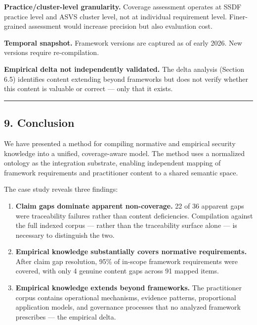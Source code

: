\documentclass[
]{article}
\begin{document}
\textbf{Practice/cluster-level granularity.} Coverage assessment
operates at SSDF practice level and ASVS cluster level, not at
individual requirement level. Finer-grained assessment would increase
precision but also evaluation cost.

\textbf{Temporal snapshot.} Framework versions are captured as of early
2026. New versions require re-compilation.

\textbf{Empirical delta not independently validated.} The delta analysis
(Section 6.5) identifies content extending beyond frameworks but does
not verify whether this content is valuable or correct --- only that it
exists.

\begin{center}\rule{0.5\linewidth}{0.5pt}\end{center}

\subsection{9. Conclusion}\label{conclusion}

We have presented a method for compiling normative and empirical
security knowledge into a unified, coverage-aware model. The method uses
a normalized ontology as the integration substrate, enabling independent
mapping of framework requirements and practitioner content to a shared
semantic space.

The case study reveals three findings:

\begin{enumerate}
\def\labelenumi{\arabic{enumi}.}
\item
  \textbf{Claim gaps dominate apparent non-coverage.} 22 of 36 apparent
  gaps were traceability failures rather than content deficiencies.
  Compilation against the full indexed corpus --- rather than the
  traceability surface alone --- is necessary to distinguish the two.
\item
  \textbf{Empirical knowledge substantially covers normative
  requirements.} After claim gap resolution, 95\% of in-scope framework
  requirements were covered, with only 4 genuine content gaps across 91
  mapped items.
\item
  \textbf{Empirical knowledge extends beyond frameworks.} The
  practitioner corpus contains operational mechanisms, evidence
  patterns, proportional application models, and governance processes
  that no analyzed framework prescribes --- the empirical delta.
\end{enumerate}
\end{document}
